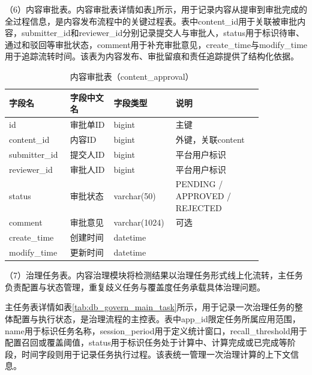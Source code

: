 （6）内容审批表。内容审批表详情如表\ref{tab:db_content_approval}所示，用于记录内容从提审到审批完成的全过程信息，是内容发布流程中的关键过程表。表中content\_\allowbreak id用于关联被审批内容，submitter\_\allowbreak id和reviewer\_\allowbreak id分别记录提交人与审批人，status用于标识待审、通过和驳回等审批状态，comment用于补充审批意见，create\_\allowbreak time与modify\_\allowbreak time用于追踪流转时间。该表为内容发布、审批留痕和责任追踪提供了结构化依据。

\begin{table}[!htbp]
  \centering
  \caption{内容审批表（content\_approval）}
  \label{tab:db_content_approval}
  \small
  \begin{tabular}{>{\raggedright\arraybackslash}p{0.20\linewidth}|>{\raggedright\arraybackslash}p{0.16\linewidth}|>{\raggedright\arraybackslash}p{0.16\linewidth}|>{\raggedright\arraybackslash}p{0.32\linewidth}}
    \hline
    字段名 & 字段中文名 & 字段类型 & 说明 \\ \hline
    id & 审批单ID & bigint & 主键 \\ \hline
    content\_id & 内容ID & bigint & 外键，关联content \\ \hline
    submitter\_id & 提交人ID & bigint & 平台用户标识 \\ \hline
    reviewer\_id & 审批人ID & bigint & 平台用户标识 \\ \hline
    status & 审批状态 & varchar(50) & PENDING / APPROVED / REJECTED \\ \hline
    comment & 审批意见 & varchar(1024) & 可选 \\ \hline
    create\_time & 创建时间 & datetime & \\ \hline
    modify\_time & 更新时间 & datetime & \\ \hline
  \end{tabular}
\end{table}

\FloatBarrier

（7）治理任务表。内容治理模块将检测结果以治理任务形式线上化流转，主任务负责配置与状态管理，重复歧义任务与覆盖度任务承载具体治理问题。

主任务表详情如表\ref{tab:db_govern_main_task}所示，用于记录一次治理任务的整体配置与执行状态，是治理流程的主控表。表中app\_\allowbreak id限定任务所属应用范围，name用于标识任务名称，session\_\allowbreak period用于定义统计窗口，recall\_\allowbreak threshold用于配置召回或覆盖阈值，status用于标识任务处于计算中、计算完成或已完成等阶段，时间字段则用于记录任务执行过程。该表统一管理一次治理计算的上下文信息。

